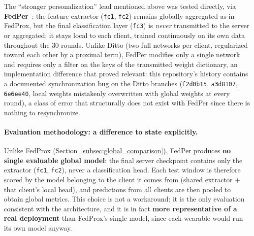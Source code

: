 \documentclass{article}
\begin{document}
The ``stronger personalization'' lead mentioned above was tested directly, via
\textbf{FedPer}~\cite{arivazhagan2019federated}: the feature extractor
(\texttt{fc1}, \texttt{fc2}) remains globally aggregated as in FedProx, but the
final classification layer (\texttt{fc3}) is \emph{never} transmitted to the
server or aggregated: it stays local to each client, trained continuously on its
own data throughout the 30 rounds. Unlike Ditto (two full networks per client,
regularized toward each other by a proximal term), FedPer modifies only a single
network and requires only a filter on the keys of the transmitted weight
dictionary, an implementation difference that proved relevant: this repository's
history contains a documented synchronization bug on the Ditto branches
(\texttt{f2d0b15}, \texttt{a3d8107}, \texttt{6e6ee40}, local weights mistakenly
overwritten with global weights at every round), a class of error that
structurally does not exist with FedPer since there is nothing to resynchronize.

\paragraph{Evaluation methodology: a difference to state explicitly.} Unlike
FedProx (Section~\ref{subsec:global_comparison}), FedPer produces \textbf{no
single evaluable global model}: the final server checkpoint contains only the
extractor (\texttt{fc1}, \texttt{fc2}), never a classification head. Each test
window is therefore scored by the model belonging to the client it comes from
(shared extractor + that client's local head), and predictions from all clients
are then pooled to obtain global metrics. This choice is not a workaround: it is
the only evaluation consistent with the architecture, and it is in fact
\textbf{more representative of a real deployment} than FedProx's single model,
since each wearable would run its own model anyway.
\end{document}
